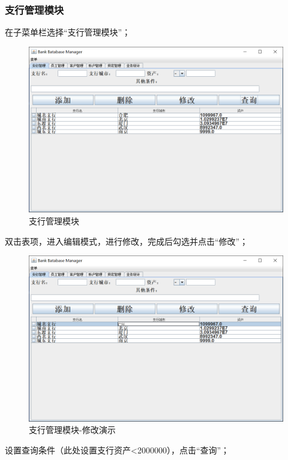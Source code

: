 \documentclass{ctexart}
\begin{document}
\subsubsection{\hei 支行管理模块}
在子菜单栏选择“支行管理模块”；
\par 
\begin{figure}[H]
    \centering
    \includegraphics[scale=0.2]{zhgl1.png}
    \caption{支行管理模块}
\end{figure}
双击表项，进入编辑模式，进行修改，完成后勾选并点击“修改”；
\begin{figure}[H]
    \centering
    \includegraphics[scale=0.2]{zhgl2.png}
    \caption{支行管理模块-修改演示}
\end{figure}
\par 
设置查询条件（此处设置支行资产<2000000），点击“查询”；
\end{document}
